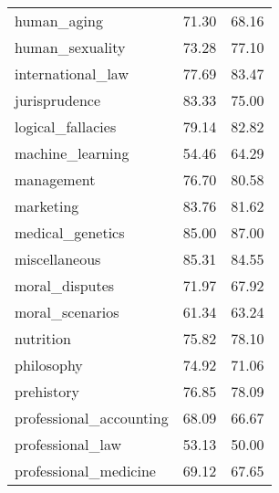 \begin{table}[t]
\begin{tabular}{L{0.35}C{0.20}C{0.20}}
        human\_aging                            & 71.30                    & 68.16                      \\
        human\_sexuality                        & 73.28                    & 77.10                      \\
        international\_law                      & 77.69                    & 83.47                      \\
        jurisprudence                           & 83.33                    & 75.00                      \\
        logical\_fallacies                      & 79.14                    & 82.82                      \\
        machine\_learning                       & 54.46                    & 64.29                      \\
        management                              & 76.70                    & 80.58                      \\
        marketing                               & 83.76                    & 81.62                      \\
        medical\_genetics                       & 85.00                    & 87.00                      \\
        miscellaneous                           & 85.31                    & 84.55                      \\
        moral\_disputes                         & 71.97                    & 67.92                      \\
        moral\_scenarios                        & 61.34                    & 63.24                      \\
        nutrition                               & 75.82                    & 78.10                      \\
        philosophy                              & 74.92                    & 71.06                      \\
        prehistory                              & 76.85                    & 78.09                      \\
        professional\_accounting                & 68.09                    & 66.67                      \\
        professional\_law                       & 53.13                    & 50.00                      \\
        professional\_medicine                  & 69.12                    & 67.65                      \\

\end{tabular}
\end{table}
